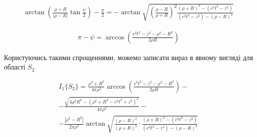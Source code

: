 %

\begin{equation*} \begin{aligned}
\arctan \left( \frac{\rho + R}{ |\rho - R| } \tan \frac{\psi}{2} \right) - 
\frac{\pi}{2} = - \arctan \sqrt{ \left( \frac{\rho - R}{\rho + R} \right)^2
\frac{\left( \rho + R \right)^2 - \left( c^2t^2 - z^2 \right)} 
{\left( c^2t^2 - z^2 \right) - \left( \rho - R \right)^2} }
\end{aligned} \end{equation*}

\begin{equation*} \begin{aligned}
\pi - \psi = \arccos \left( \frac{c^2 t^2 - z^2 - \rho^2 - R^2}{2 \rho R} \right)
\end{aligned} \end{equation*}

Користуючись такими спрощеннями, можемо записати вираз в явному вигляді для 
області $ S_2 $

\begin{equation*} \begin{aligned}
I_1 \{ S_2 \} = \frac{\rho^2 + R^2}{4 \pi \rho^2} \arccos 
\left( \frac{c^2 t^2 - z^2 - \rho^2 - R^2}{2 \rho R} \right) - \\
- \frac{\sqrt{4 \rho^2 R^2 - (\rho^2 + R^2 - c^2t^2 + z^2)^2}}{4 \pi \rho^2} - \\
- \frac{ |\rho^2 - R^2| }{2 \pi \rho^2} 
\arctan \sqrt{ \frac{(\rho - R)^2}{(\rho + R)^2} \cdot
\frac{\left( \rho + R \right)^2 - \left( c^2t^2 - z^2 \right)} 
{\left( c^2t^2 - z^2 \right) - \left( \rho - R \right)^2} }
\end{aligned} \end{equation*}

